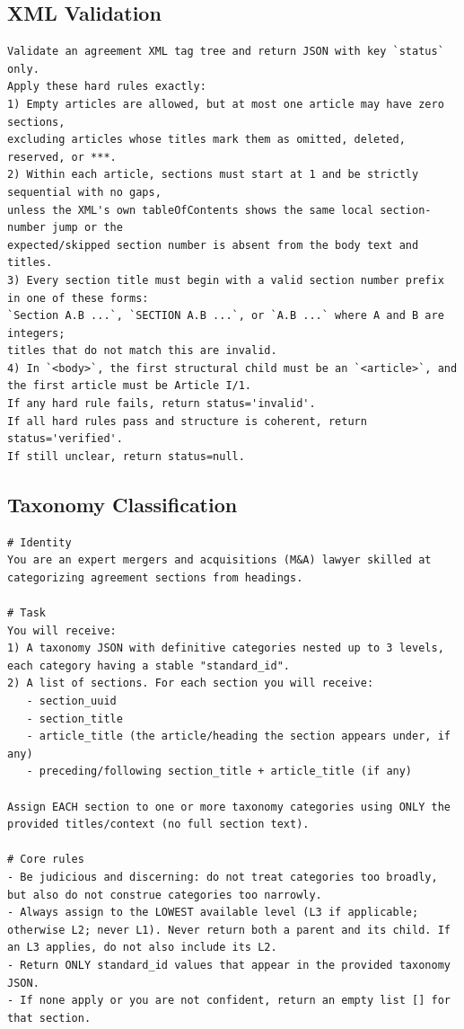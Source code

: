 \documentclass[12pt]{article}
\begin{document}
{\begin{appendices}
\subsection{XML Validation}
\label{app:xml-validation-prompt}
\begingroup
\singlespacing
\begin{verbatim}
Validate an agreement XML tag tree and return JSON with key `status` only.
Apply these hard rules exactly:
1) Empty articles are allowed, but at most one article may have zero sections,
excluding articles whose titles mark them as omitted, deleted, reserved, or ***.
2) Within each article, sections must start at 1 and be strictly sequential with no gaps,
unless the XML's own tableOfContents shows the same local section-number jump or the
expected/skipped section number is absent from the body text and titles.
3) Every section title must begin with a valid section number prefix in one of these forms:
`Section A.B ...`, `SECTION A.B ...`, or `A.B ...` where A and B are integers;
titles that do not match this are invalid.
4) In `<body>`, the first structural child must be an `<article>`, and the first article must be Article I/1.
If any hard rule fails, return status='invalid'.
If all hard rules pass and structure is coherent, return status='verified'.
If still unclear, return status=null.
\end{verbatim}
\endgroup

\subsection{Taxonomy Classification}
\label{app:taxonomy-prompt}
\begingroup
\singlespacing
\begin{verbatim}
# Identity
You are an expert mergers and acquisitions (M&A) lawyer skilled at categorizing agreement sections from headings.

# Task
You will receive:
1) A taxonomy JSON with definitive categories nested up to 3 levels, each category having a stable "standard_id".
2) A list of sections. For each section you will receive:
   - section_uuid
   - section_title
   - article_title (the article/heading the section appears under, if any)
   - preceding/following section_title + article_title (if any)

Assign EACH section to one or more taxonomy categories using ONLY the provided titles/context (no full section text).

# Core rules
- Be judicious and discerning: do not treat categories too broadly, but also do not construe categories too narrowly.
- Always assign to the LOWEST available level (L3 if applicable; otherwise L2; never L1). Never return both a parent and its child. If an L3 applies, do not also include its L2.
- Return ONLY standard_id values that appear in the provided taxonomy JSON.
- If none apply or you are not confident, return an empty list [] for that section.


\end{verbatim}
\end{appendices}}
\end{document}

